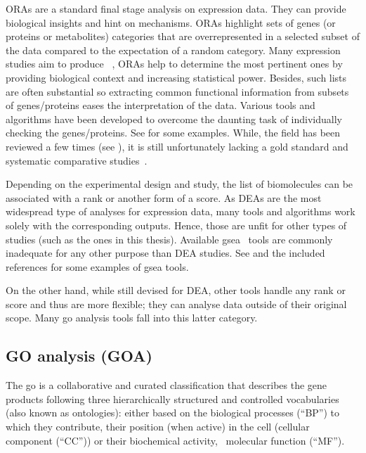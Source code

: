 \Glspl{ORA} are a standard final stage analysis on expression data.
They can provide biological insights and hint on mechanisms.
\Glspl{ORA} highlight sets of genes (or proteins or metabolites) categories
that are overrepresented in a selected subset of the data
compared to the expectation of a random category.
Many expression studies aim to produce ~,
\glspl{ORA} help to determine the most pertinent ones
by providing biological context and increasing statistical power.
Besides, such lists are often substantial
so extracting common functional information from subsets of genes/proteins eases
the interpretation of the data.
Various tools and algorithms have been developed
to overcome the daunting task of individually checking the genes/proteins.
See \citet{Shi_Jing2015-yh} for some examples.
While, the field has been reviewed a few times
(see \citet{Khatri2005-su,Huang2009-zk,Khatri2012-ki}),
it is still unfortunately lacking a gold standard
and systematic comparative studies~.

Depending on the experimental design and study,
the list of biomolecules can be associated with a rank or another form of a score.
As \glspl{DEA} are the most widespread type of analyses for expression data,
many tools and algorithms work solely with the corresponding outputs.
Hence, those are unfit for other types of studies
(such as the ones in this thesis).
Available \gls{gsea}~ tools are commonly inadequate
for any other purpose than \gls{DEA} studies.
See \citet{Tamayo2012-qw,Irizarry2009-sc}
and the included references for some examples of \gls{gsea} tools.

On the other hand, while still devised for \gls{DEA},
other tools handle any rank or score and thus are more flexible;
they can analyse data outside of their original scope.
Many \gls{go} analysis tools fall into this latter category.\\
\vspace{-\baselineskip}

\subsection{GO analysis (GOA)}\label{sec:goaGeneralities}
The \gls{go} is a collaborative and curated classification
that describes the gene products
following three hierarchically structured and controlled vocabularies
(also known as ontologies):
either based on the biological processes (\enquote{BP}) to which they contribute,
their position (when active) in the cell (cellular component (\enquote{CC})) or
their biochemical activity, \ie\ molecular function (\enquote{MF}).~

